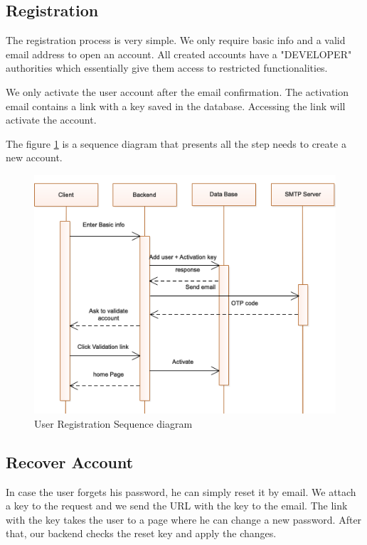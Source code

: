 \begin{spacing}{1.2}
\subsection{Registration}
The registration process is very simple. We only require basic info and a valid email address to open an account. All created accounts have a "DEVELOPER" authorities which essentially give them access to restricted functionalities. 

We only activate the user account after the email confirmation. The activation email contains a link with a key saved in the database. Accessing the link will activate the account.

The figure \ref{fig:register} is a sequence diagram that presents all the step needs to create a new account.

\begin{figure}[H]\centering
\includegraphics[scale=0.8]{Register_user_sequence_diagram.png}
\caption{User Registration Sequence diagram}
\label{fig:register}
\end{figure}



\subsection{Recover Account}
In case the user forgets his password, he can simply reset it by email. We attach a key to the request and we send the URL with the key to the email. The link with the key takes the user to a page where he can change a new password. After that, our backend checks the reset key and apply the changes.


\end{spacing}
